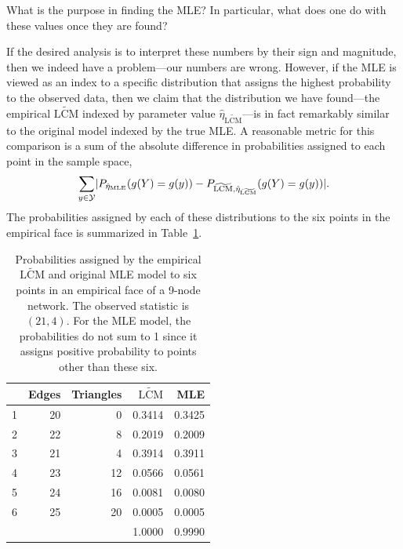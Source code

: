 What is the purpose in finding the MLE?  In particular, what does one do with these values once they are found?

If the desired analysis is to interpret these numbers by their sign and  
magnitude, then we indeed have a problem---our numbers are wrong.  
However, if the MLE is viewed as an 
index to a specific distribution that assigns the highest probability to the observed data,
then we claim that the distribution we have found---the empirical $\widetilde{\textrm{LCM}}$ indexed by parameter value 
$\hat{\eta}_{\widetilde{\textrm{LCM}}}$---is in fact remarkably similar to the original model indexed by the true MLE.  A 
reasonable metric for this comparison is a sum of the absolute difference in 
probabilities assigned to each point in the sample space,
\begin{align*}
	\sum_{y \in {\mathcal Y}} \lvert  P_{\hat{\eta}_{\textrm{MLE}}}(g(Y) =g(y) ) -  P_{\widetilde{\textrm{LCM}},\hat{\eta}_{\widetilde{\textrm{LCM}}}}(g(Y) = g(y))   \rvert.
\end{align*}
The probabilities assigned by each of these distributions to the six points in the 
empirical face is summarized in Table~\ref{T:LCMvsMLE}.

\begin{table}[h!] 
\begin{center}
\caption[Comparison of probabilities assigned by $\widetilde{\textrm{LCM}}$ and 
original MLE model to an empirical face of a 9-node network]
{Probabilities assigned by the empirical $\widetilde{\textrm{LCM}}$ and original MLE model 
to six points in an empirical face of a 9-node network.  The observed statistic is 
$(21,4)$.  For the MLE model, the probabilities do not sum to 1 since it assigns 
positive probability to points other than these six.}

\begin{tabular}{rrrrr}
\\  \hline
 & Edges & Triangles & $\widetilde{\textrm{LCM}}$ & MLE \\ 
  \hline
1 & 20 & 0 & 0.3414 & 0.3425 \\ 
  2 & 22 & 8 & 0.2019 & 0.2009 \\ 
  3 & 21 & 4 & 0.3914 & 0.3911 \\ 
  4 & 23 & 12 & 0.0566 & 0.0561 \\ 
  5 & 24 & 16 & 0.0081 & 0.0080 \\ 
  6 & 25 & 20 & 0.0005 & 0.0005 \\ 
   \hline
   &  &  & 1.0000 & 0.9990 \\ 
\end{tabular}\label{T:LCMvsMLE}
\end{center}
\end{table}

